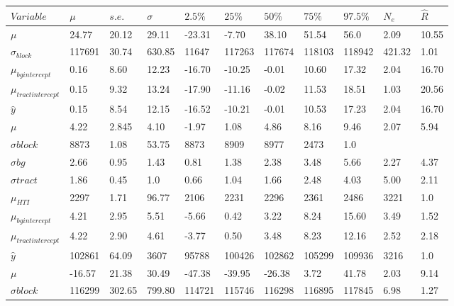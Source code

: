 \documentclass[a4paper,UKenglish]{lipics-v2018}
\begin{document}
\begin{table}
 \label{tab:table4}

\begin{tabular}{p{2.4cm}p{1.5cm}p{1.5cm}p{1.5cm}p{1.5cm}p{1.5cm}p{1.5cm}p{1.5cm}p{1.5cm}p{1.5cm}p{1cm}}
    \toprule
    {$Variable$} & {$\mu$} & {$s.e.$} & {$\sigma$} & {$2.5\%$} & {$25\%$} & {$50\%$} & {$75\%$}  & {$97.5\%$} & {$N_e$} & {$\hat{R}$} \\ \midrule
    {$\mu$} & 24.77 & 20.12 & 29.11 & -23.31 & -7.70 & 38.10 & 51.54 & 56.0 & 2.09 & 10.55 \\
    {$\sigma_{block}$} & 117691 &30.74 &630.85 & 11647 & 117263 & 117674 & 118103 & 118942 & 421.32 & 1.01  \\
    {$\mu_{bg intercept}$} & 0.16 & 8.60 & 12.23  & -16.70 & -10.25 & -0.01 & 10.60 & 17.32 & 2.04 & 16.70 \\
    {$\mu_{tract intercept}$} & 0.15  &9.32 & 13.24 & -17.90 & -11.16 & -0.02 &11.53 & 18.51 & 1.03 & 20.56\\
    {$\hat{y}$} & 0.15 & 8.54 & 12.15  & -16.52 & -10.21 & -0.01 & 10.53 & 17.23 & 2.04 & 16.70  \\
    \midrule
    {$\mu$}  & 4.22  & 2.845 & 4.10  & -1.97 & 1.08 & 4.86  & 8.16 & 9.46 & 2.07 & 5.94 \\
    {$\sigma{block}$}  & 8873  & 1.08 & 53.75  & 8873 & 8909 & 8977  & 2473 & 1.0   \\
    {$\sigma{bg}$} & 2.66  &  0.95 & 1.43  & 0.81 & 1.38  & 2.38  & 3.48 & 5.66 & 2.27 & 4.37  \\ 
    {$\sigma{tract}$}  & 1.86  & 0.45 & 1.0  & 0.66 & 1.04 & 1.66  & 2.48 & 4.03 & 5.00 & 2.11 \\
    {$\mu_{HTI}$} & 2297   & 1.71 & 96.77  & 2106 & 2231 & 2296  & 2361 & 2486 & 3221 & 1.0  \\
    {$\mu_{bg intercept}$} & 4.21  & 2.95 & 5.51  & -5.66 & 0.42 &  3.22  & 8.24 & 15.60 & 3.49 & 1.52 \\ 
    {$\mu_{tract intercept}$} & 4.22 & 2.90 & 4.61  & -3.77 & 0.50 &  3.48  & 8.23 & 12.16 & 2.52 & 2.18 \\
    {$\hat{y}$}  &102861 & 64.09 & 3607  & 95788 & 100426 &  102862  & 105299 & 109936 & 3216  & 1.0 \\
    \midrule
    {$\mu$}  & -16.57  & 21.38 & 30.49 & -47.38  & -39.95 & -26.38 & 3.72  & 41.78 & 2.03 & 9.14 \\
    {$\sigma{block}$}  & 116299  & 302.65 & 799.80  & 114721 & 115746 & 116298  & 116895 & 117845  &6.98 & 1.27 \\

\end{tabular}
\end{table}
\end{document}
